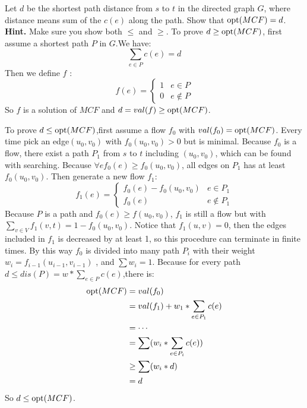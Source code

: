 \documentclass[11pt,a4paper,oneside]{article}
\newcommand{\opt}{\textup{\textrm{opt}}}
\begin{document}
\begin{problem}{2}
	\statement
   Let $d$ be the shortest path distance from $s$ to $t$ in the directed graph $G$, where distance
   means sum of the $c(e)$ along the path. Show that $\opt(MCF) = d$.
   \textbf{Hint.} Make sure you show both $\leq$ and $\geq$.
    \solution
	To prove $d\geq \opt(MCF)$, first assume a shortest path $P$ in $G$.We have: 
	$$\sum_{e \in P} c(e)=d$$
	Then we define $f$ :
	\begin{equation}
	f(e)=
	\begin{cases}
	1& e\in P\\
	0& e\notin P
	\end{cases}
	\end{equation}
	So $f$ is a solution of $MCF$ and $d=val(f)\geq \opt(MCF)$.
	
	To prove $d\leq \opt(MCF)$,first assume a flow $f_0$ with $val(f_0)=\opt(MCF)$.
	Every time pick an edge$(u_0,v_0)$ with $f_0(u_0,v_0)>0$ but is minimal. 
	Because $f_0$ is a flow, there exist a path $P_1$ from $s$ to $t$ including $(u_0,v_0)$, which can be found with searching.
	Because $\forall ef_0(e)\geq f_0(u_0,v_0)$, all edges on $P_1$ has at least $f_0(u_0,v_0)$.
	Then generate a new flow $f_1$:
	\begin{equation}
	f_1(e)=
	\begin{cases}
	f_0(e)-f_0(u_0,v_0)& e\in P_1\\
	f_0(e)& e\notin P_1
	\end{cases}
	\end{equation}
	Because $P$ is a path and $f_0(e)\geq f(u_0,v_0)$, $f_1$ is still a flow but with $\sum_{v \in V} f_1(v,t) = 1-f_0(u_0,v_0)$.
	Notice that $f_1(u,v)=0$, then the edges included in $f_1$ is decreased by at least 1, so this procedure can terminate in finite times.
	By this way $f_0$ is divided into many path $P_i$ with their weight 
	$w_i=f_{i-1}(u_{i-1},v_{i-1})$ , and $\sum w_i=1$. 
	Because for every path $d\leq dis(P)=w*\sum_{e \in P} c(e)$,there is:
	\begin{align*}
	\opt(MCF)&=val(f_0)\\
			&=val(f_1)+w_1*\sum_{e \in P_1} c(e)\\
			&=\cdots\\
			&=\sum (w_i*\sum_{e \in P_i} c(e))\\
			&\geq \sum(w_i*d)\\
			&=d
	\end{align*}
	So $d\leq \opt(MCF)$.
\end{problem}
\end{document}
